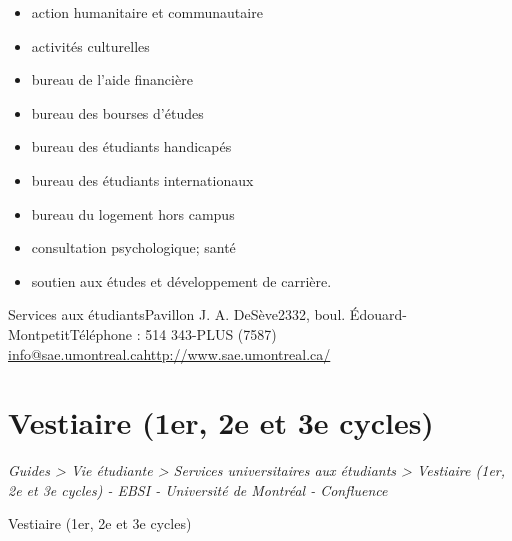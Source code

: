 \documentclass [12 pt]{article}
\begin{document}
        \begin{itemize}
        
                
        \item action humanitaire et communautaire
                
        \item activités culturelles
                
        \item bureau de l'aide financière
                
        \item bureau des bourses d'études
                
        \item bureau des étudiants handicapés
                
        \item bureau des étudiants internationaux
                
        \item bureau du logement hors campus
                
        \item consultation psychologique; santé
                
        \item soutien aux études et développement de carrière.
            
        \end{itemize}
    
            
                Services aux étudiantsPavillon J. A. DeSève2332, boul.
                    Édouard-MontpetitTéléphone : 514 343-PLUS (7587)
        \href{
        http://www.sae.umontreal.ca/
        } {
        info@sae.umontreal.cahttp://www.sae.umontreal.ca/
        }
    
            
        
    
    
        \newpage
        \section {
        Vestiaire (1er, 2e et 3e cycles)
        }
        
        
        
        \textit{
        Guides > Vie étudiante > Services universitaires aux étudiants > Vestiaire
            (1er, 2e et 3e cycles) - EBSI - Université de Montréal - Confluence
        }
    
        Vestiaire (1er, 2e et 3e cycles)
        
\end{document}
